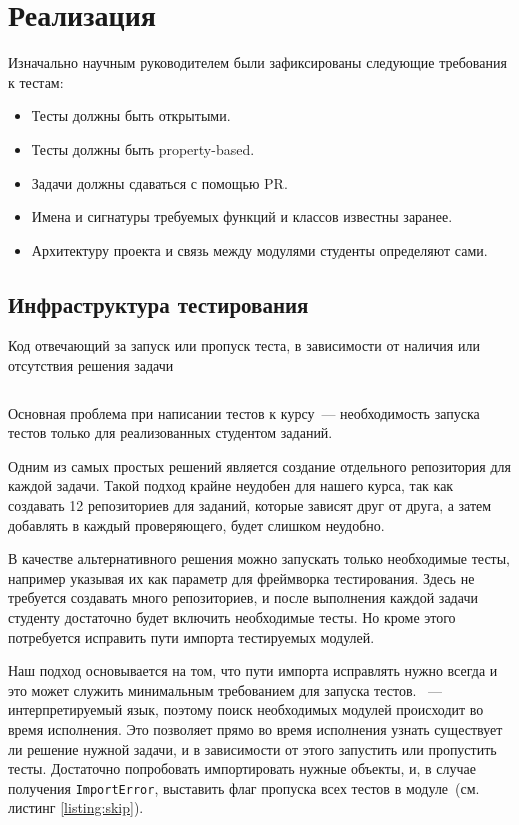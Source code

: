 
\section{Реализация}

Изначально научным руководителем были зафиксированы следующие требования к тестам:
\begin{itemize}
    \item Тесты должны быть открытыми.
    \item Тесты должны быть property-based.
    \item Задачи должны сдаваться с помощью PR.
    \item Имена и сигнатуры требуемых функций и классов известны заранее.
    \item Архитектуру проекта и связь между модулями студенты определяют сами.
\end{itemize}

\subsection{Инфраструктура тестирования}
\label{subsec:infra}

\begin{listing}[b]
    \caption{Код отвечающий за запуск или пропуск теста, в зависимости от наличия или отсутствия решения задачи}
    \inputminted[linenos, breaklines, frame=single, fontsize = \small]{python3}{figures/minimal_example.py}
    \label{listing:skip}
\end{listing}

Основная проблема при написании тестов к курсу~--- необходимость запуска тестов только для реализованных студентом заданий.

Одним из самых простых решений является создание отдельного репозитория для каждой задачи.
Такой подход крайне неудобен для нашего курса, так как создавать 12 репозиториев для заданий, которые зависят друг от друга, а затем добавлять в каждый проверяющего, будет слишком неудобно.

В качестве альтернативного решения можно запускать только необходимые тесты, например указывая их как параметр для фреймворка тестирования.
Здесь не требуется создавать много репозиториев, и после выполнения каждой задачи студенту достаточно будет включить необходимые тесты.
Но кроме этого потребуется исправить пути импорта тестируемых модулей.

Наш подход основывается на том, что пути импорта исправлять нужно всегда и это может служить минимальным требованием для запуска тестов.
\python{}~--- интерпретируемый язык, поэтому поиск необходимых модулей происходит во время исполнения.
Это позволяет прямо во время исполнения узнать существует ли решение нужной задачи, и в зависимости от этого запустить или пропустить тесты.
Достаточно попробовать импортировать нужные объекты, и, в случае получения \texttt{ImportError}, выставить флаг пропуска всех тестов в модуле~(см. листинг \ref{listing:skip}).

